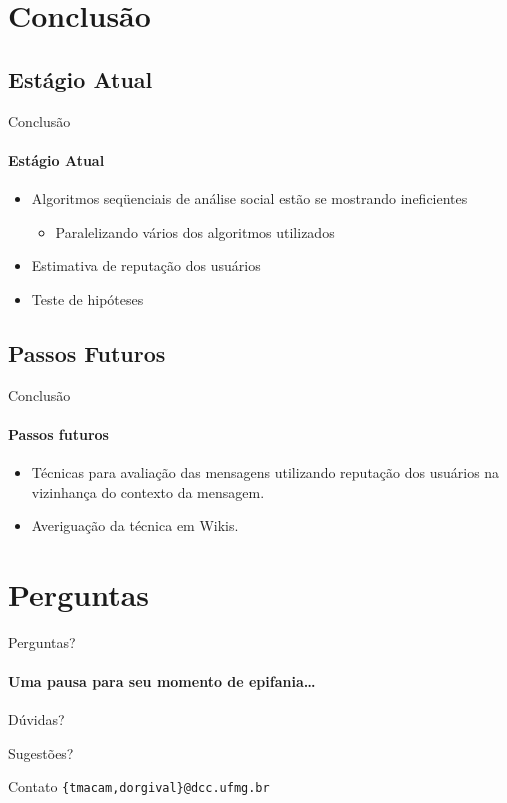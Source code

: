 \documentclass[compress]{beamer}
\begin{document}
\section{Conclusão}
\subsection{Estágio Atual}

    \begin{frame}{Conclusão}
    \framesubtitle{Estágio Atual}
        \begin{itemize}
            \item Algoritmos seqüenciais de análise social estão se
            mostrando ineficientes
            \pause
            \begin{itemize}
                \item Paralelizando vários dos algoritmos utilizados
            \end{itemize}
            \pause

            \item Estimativa de reputação dos usuários\pause

            \item Teste de hipóteses\pause
        \end{itemize}
    \end{frame}

\subsection{Passos Futuros}

    \begin{frame}{Conclusão}
    \framesubtitle{Passos futuros}
        \begin{itemize}
            \item Técnicas para avaliação das mensagens utilizando
            reputação dos usuários na vizinhança do contexto da
            mensagem.

            \item Averiguação da técnica em Wikis.
        \end{itemize}
    \end{frame}


\section{Perguntas}
\begin{frame}{Perguntas?}
\framesubtitle{Uma pausa para seu momento de epifania\ldots}

    Dúvidas?
    \vspace{1cm}
    \pause

    Sugestões?
    \vspace{1cm}
    \pause

    \begin{block}{Contato}
    \texttt{\{tmacam,dorgival\}@dcc.ufmg.br}
    \end{block}

\end{frame}
\end{document}
